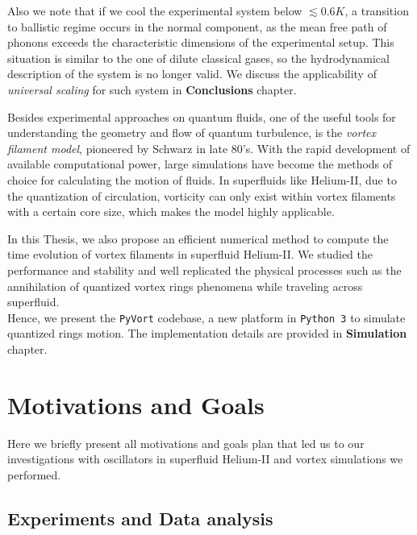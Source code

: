 	Also we note that if we cool the experimental system below $\lesssim 0.6\unit{K}$, a transition to ballistic regime occurs in the normal component, as the mean free path of phonons exceeds the characteristic dimensions of the experimental setup. This situation is similar to the one of dilute classical gases, so the hydrodynamical description of the system is no longer valid. We discuss the applicability of \textit{universal scaling} for such system in \textbf{Conclusions} chapter.

	Besides experimental approaches on quantum fluids, one of the useful tools for understanding the geometry and flow of quantum turbulence, is the \textit{vortex filament model}, pioneered by Schwarz \cite{schwarz} in late 80's. With the rapid development of available computational power, large simulations have become the methods of choice for calculating the motion of fluids. In superfluids like Helium-II, due to the quantization of circulation, vorticity can only exist within vortex filaments with a certain core size, which makes the model highly applicable.

	In this Thesis, we also propose an efficient numerical method to compute the time evolution of vortex filaments in superfluid Helium-II. We studied the performance and stability and well replicated the physical processes such as the annihilation of quantized vortex rings \cite{vortex_ring} phenomena while traveling across superfluid.\\
	Hence, we present the \texttt{PyVort} codebase, a new platform in \texttt{Python 3} to simulate quantized rings motion. The implementation details are provided in \textbf{Simulation} chapter.


	\section*{Motivations and Goals}

	Here we briefly present all motivations and goals plan that led us to our investigations with oscillators in superfluid Helium-II and vortex simulations we performed.

	\subsection*{Experiments and Data analysis}

